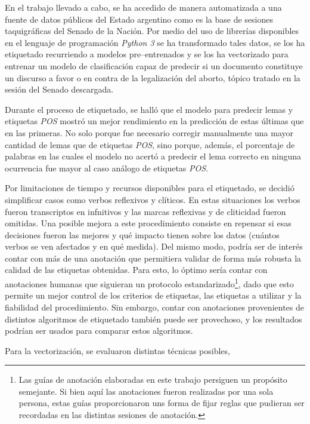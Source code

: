 En el trabajo llevado a cabo, se ha accedido de manera automatizada
a una fuente de datos p\'ublicos del Estado argentino como es
la base de sesiones taquigr\'aficas del Senado de la Naci\'on. Por medio
del uso de librer\'ias disponibles en el lenguaje de programaci\'on
\textit{Python 3} se ha transformado tales datos, se los ha etiquetado
recurriendo a modelos pre{--}entrenados y se los ha vectorizado
para entrenar un modelo de clasificación capaz de predecir si un
documento constituye un discurso a favor o en contra de la legalizaci\'on
del aborto, t\'opico tratado en la sesi\'on del Senado descargada.
\par
Durante el proceso de etiquetado, se halló que el modelo para
predecir lemas y etiquetas \textit{POS} mostr\'o un mejor rendimiento
en la predicción de estas últimas que en las primeras. No solo
porque fue necesario corregir manualmente una mayor cantidad de lemas
que de etiquetas \textit{POS}, sino porque, adem\'as, el porcentaje
de palabras en las cuales el modelo no acertó a predecir el lema
correcto en ninguna ocurrencia fue mayor al caso an\'alogo de etiquetas
\textit{POS}. 
\par
Por limitaciones de tiempo y recursos disponibles para el etiquetado,
se decidió simplificar casos como verbos reflexivos y cl\'iticos. En
estas situaciones los verbos fueron transcriptos en infnitivos y las
marcas reflexivas y de cliticidad fueron omitidas.
Una posible mejora a este procedimiento consiste en repensar si esas
decisiones fueron las mejores y qu\'e impacto tienen sobre los datos
(cu\'antos verbos se ven afectados y en qu\'e medida). Del mismo modo,
podr\'ia ser de inter\'es contar con m\'as de una anotaci\'on que
permitiera validar de forma m\'as robusta la calidad de las etiquetas
obtenidas. Para esto, lo \'optimo ser\'ia contar con anotaciones
humanas que siguieran un protocolo estandarizado\footnote{Las gu\'ias
de anotaci\'on elaboradas en este trabajo persiguen un prop\'osito
semejante. Si bien aqu\'i las anotaciones fueron realizadas por una sola
persona, estas gu\'ias proporcionaron uns forma de fijar reglas que
pudieran ser recordadas en las distintas sesiones de anotaci\'on.}, dado
que esto permite un mejor control de los criterios de etiquetas, las 
etiquetas a utilizar y la fiabilidad del procedimiento. Sin embargo,
contar con anotaciones provenientes de distintos algoritmos de etiquetado
también puede ser provechoso, y los resultados podr\'ian ser usados
para comparar estos algoritmos.
\par
Para la vectorizaci\'on, se evaluaron distintas t\'ecnicas posibles,
